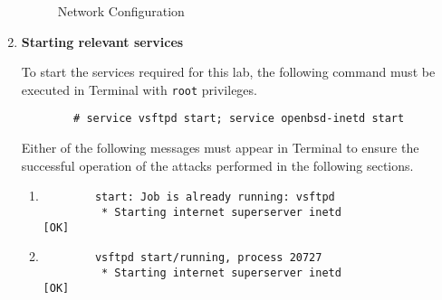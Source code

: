 \documentclass[a4paper,12pt]{article}
\begin{document}
\begin{enumerate}
\begin{figure}[H]
			\caption{Network Configuration}
			\label{fig:Networksetup}
		\end{figure}
			
		\item{\textbf{Starting relevant services}}
		\begin{par}
		To start the services required for this lab, the following command must be executed in Terminal with \texttt{root} privileges.
		\begin{verbatim}
		# service vsftpd start; service openbsd-inetd start
		\end{verbatim}
		Either of the following messages must appear in Terminal to ensure the successful operation of the attacks performed in the following sections.
		\end{par}
		\begin{enumerate}
			\item
			\begin{par}
		\end{par}
		\begin{verbatim}
		start: Job is already running: vsftpd
		 * Starting internet superserver inetd                [OK]
		\end{verbatim}
		\item
		\begin{par}
		\begin{verbatim}
		vsftpd start/running, process 20727
		 * Starting internet superserver inetd                [OK]
		\end{verbatim}
		\end{par}
	\end{enumerate}
\end{enumerate}
\end{document}
